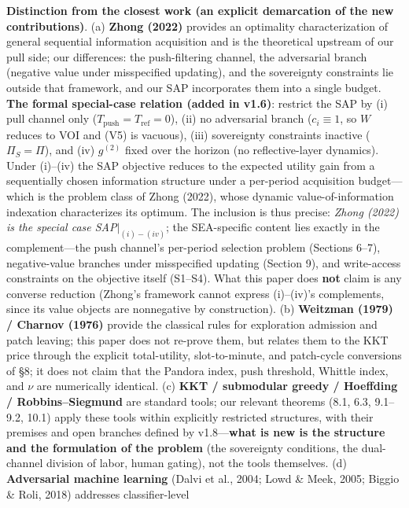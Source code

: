 \documentclass[
  11pt]{article}
\begin{document}
\textbf{Distinction from the closest work (an explicit demarcation of
the new contributions)}. (a) \textbf{Zhong (2022)} provides an
optimality characterization of general sequential information
acquisition and is the theoretical upstream of our pull side; our
differences: the push-filtering channel, the adversarial branch
(negative value under misspecified updating), and the sovereignty
constraints lie outside that framework, and our SAP incorporates them
into a single budget. \textbf{The formal special-case relation (added in
v1.6)}: restrict the SAP by (i) pull channel only
(\(T_{\mathrm{push}} = T_{\mathrm{ref}} = 0\)), (ii) no adversarial
branch (\(c_i \equiv 1\), so \(W\) reduces to VOI and (V5) is vacuous),
(iii) sovereignty constraints inactive (\(\Pi_S = \Pi\)), and (iv)
\(g^{(2)}\) fixed over the horizon (no reflective-layer dynamics). Under
(i)--(iv) the SAP objective reduces to the expected utility gain from a
sequentially chosen information structure under a per-period acquisition
budget---which is the problem class of Zhong (2022), whose dynamic
value-of-information indexation characterizes its optimum. The inclusion
is thus precise: \emph{Zhong (2022) is the special case
SAP\(|_{(i)-(iv)}\)}; the SEA-specific content lies exactly in the
complement---the push channel's per-period selection problem (Sections
6--7), negative-value branches under misspecified updating (Section 9),
and write-access constraints on the objective itself (S1--S4). What this
paper does \textbf{not} claim is any converse reduction (Zhong's
framework cannot express (i)--(iv)'s complements, since its value
objects are nonnegative by construction). (b) \textbf{Weitzman (1979) /
Charnov (1976)} provide the classical rules for exploration admission
and patch leaving; this paper does not re-prove them, but relates them
to the KKT price through the explicit total-utility, slot-to-minute, and
patch-cycle conversions of §8; it does not claim that the Pandora index,
push threshold, Whittle index, and \(\nu\) are numerically identical.
(c) \textbf{KKT / submodular greedy / Hoeffding / Robbins--Siegmund} are
standard tools; our relevant theorems (8.1, 6.3, 9.1--9.2, 10.1) apply
these tools within explicitly restricted structures, with their premises
and open branches defined by v1.8---\textbf{what is new is the structure
and the formulation of the problem} (the sovereignty conditions, the
dual-channel division of labor, human gating), not the tools themselves.
(d) \textbf{Adversarial machine learning} (Dalvi et al., 2004; Lowd \&
Meek, 2005; Biggio \& Roli, 2018) addresses classifier-level
\end{document}

